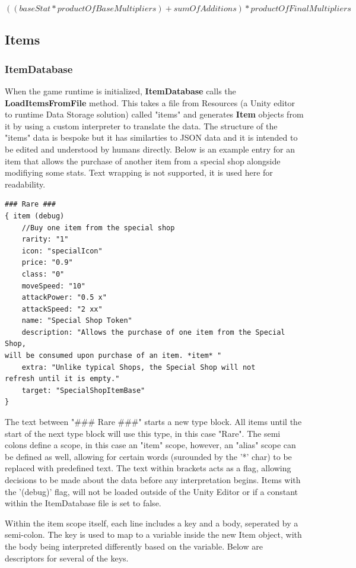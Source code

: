 \documentclass{report}
\begin{document}
\[((baseStat * productOfBaseMultipliers) + sumOfAdditions) * productOfFinalMultipliers \]

\subsection{Items}

\subsubsection{ItemDatabase}

When the game runtime is initialized, \textbf{ItemDatabase} calls the \textbf{LoadItemsFromFile} method. This takes a file from Resources (a Unity editor to runtime Data Storage solution) called "items" and generates \textbf{Item} objects from it by using a custom interpreter to translate the data. The structure of the "items" data is bespoke but it has similarties to JSON data and it is intended to be edited and understood by humans directly. Below is an example entry for an item that allows the purchase of another item from a special shop alongside modifiying some stats. Text wrapping is not supported, it is used here for readability.

\begin{Verbatim}[frame=single]
### Rare ###
{ item (debug)
	//Buy one item from the special shop
	rarity: "1"
	icon: "specialIcon"
	price: "0.9"
	class: "0"
	moveSpeed: "10"
	attackPower: "0.5 x" 
	attackSpeed: "2 xx"
	name: "Special Shop Token"
	description: "Allows the purchase of one item from the Special Shop, 
will be consumed upon purchase of an item. *item* "
	extra: "Unlike typical Shops, the Special Shop will not 
refresh until it is empty."
	target: "SpecialShopItemBase"
}
\end{Verbatim}

The text between "\#\#\# Rare \#\#\#" starts a new type block. All items until the start of the next type block will use this type, in this case "Rare". The semi colons define a scope, in this case an "item" scope, however, an "alias" scope can be defined as well, allowing for certain words (surounded by the '*' char) to be replaced with predefined text. The text within brackets acts as a flag, allowing decisions to be made about the data before any interpretation begins. Items with the '(debug)' flag, will not be loaded outside of the Unity Editor or if a constant within the ItemDatabase file is set to false.

Within the item scope itself, each line includes a key and a body, seperated by a semi-colon. The key is used to map to a variable inside the new Item object, with the body being interpreted differently based on the variable. Below are descriptors for several of the keys.
\end{document}
